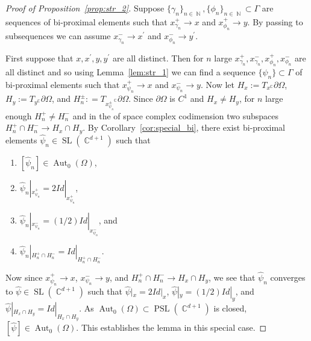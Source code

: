 \documentclass[12pt]{amsart}
\theoremstyle{plain}
\theoremstyle{definition}
\theoremstyle{remark}
\begin{document}
\begin{proof}[Proof of Proposition~\ref{prop:str_2}]
Suppose $\{\gamma_n\}_{n \in \operatorname{\mathbb{N}}}, \{\phi_n\}_{n \in \operatorname{\mathbb{N}}} \subset \Gamma$ are sequences of bi-proximal elements such that $x^+_{\gamma_n} \rightarrow x$ and $x^+_{\phi_n} \rightarrow y$. By passing to subsequences we can assume $x^-_{\gamma_n} \rightarrow x^\prime$ and $x^-_{\phi_n} \rightarrow y^\prime$. 

First suppose that $x,x^\prime, y,y^\prime$ are all distinct. Then for $n$ large $x^+_{\gamma_n}, x^-_{\gamma_n}, x^+_{\phi_n}, x^-_{\phi_n}$ are all distinct and so using Lemma~\ref{lem:str_1} we can find a sequence $\{\psi_n\} \subset \Gamma $ of bi-proximal elements such that $x^+_{\psi_n} \rightarrow x$ and $x^-_{\psi_n} \rightarrow y$. Now let $H_x := T_x^\operatorname{\mathbb{C}} \partial \Omega$, $H_y := T_y^\operatorname{\mathbb{C}} \partial \Omega$, and  $H_n^{\pm}: = T_{x^{\pm}_{\psi_n}}^\operatorname{\mathbb{C}} \partial \Omega$. Since $\partial \Omega$ is $C^1$ and $H_x \neq H_y$,  for $n$ large enough $H_n^+ \neq H_n^-$ and in the of space complex codimension two subspaces $H_n^+ \cap H_n^- \rightarrow H_x \cap H_y$. By Corollary~\ref{cor:special_bi}, there exist bi-proximal elements $\hat{\psi}_n \in \operatorname{SL}(\operatorname{\mathbb{C}}^{d+1})$ such that 
\begin{enumerate}
\item $[\hat{\psi}_n] \in \operatorname{Aut}_0(\Omega)$, 
\item $\hat{\psi}_n|_{x^+_{\psi_n}} = 2Id|_{x^+_{\psi_n}}$, 
\item $\hat{\psi}_n|_{x^-_{\psi_n}} = (1/2)Id|_{x^-_{\psi_n}}$, and 
\item $\hat{\psi}_n|_{H_n^+ \cap H_n^-} = Id|_{H_n^+ \cap H_n^-}$. 
\end{enumerate}
Now since $x^+_{\psi_n} \rightarrow x$, $x^-_{\psi_n} \rightarrow y$, and $H_n^+ \cap H_n^- \rightarrow H_x \cap H_y$, we see that $\hat{\psi}_n$ converges to $\hat{\psi} \in \operatorname{SL}(\operatorname{\mathbb{C}}^{d+1})$ such that $\hat{\psi}|_{x}=2Id|_{x}$, $\hat{\psi}|_{y}=(1/2)Id|_{y}$, and $\hat{\psi}|_{H_x \cap H_y} = Id|_{H_x \cap H_y}$. As $\operatorname{Aut}_0(\Omega) \subset \operatorname{PSL}(\operatorname{\mathbb{C}}^{d+1})$ is closed, $[\hat{\psi}] \in \operatorname{Aut}_0(\Omega)$. This establishes the lemma in this special case.


\end{proof}
\end{document}
